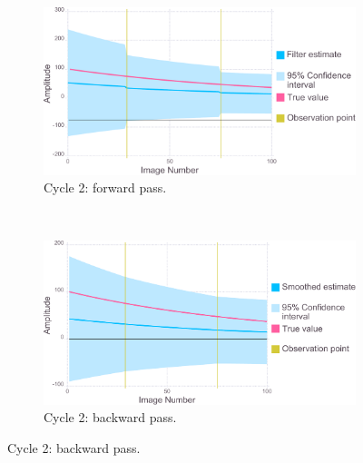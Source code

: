 \begin{figure}
    \ContinuedFloat
    \begin{subfigure}[b]{1.0\textwidth}
        \centering
        \includegraphics[width=\textwidth]{figures/datared/intDecSim_Filt2.pdf}
        \caption{Cycle 2: forward pass.}
        \label{fig:UKF simulation results - cycle 2 - good}
    \end{subfigure}
    \\
    \begin{subfigure}[b]{1.0\textwidth}
        \centering
        \includegraphics[width=\textwidth]{figures/datared/intDecSim2.pdf}
        \caption{Cycle 2: backward pass.}
        \label{fig:URTSS simulation results - cycle 2 - good}
    \end{subfigure}
\end{figure}
